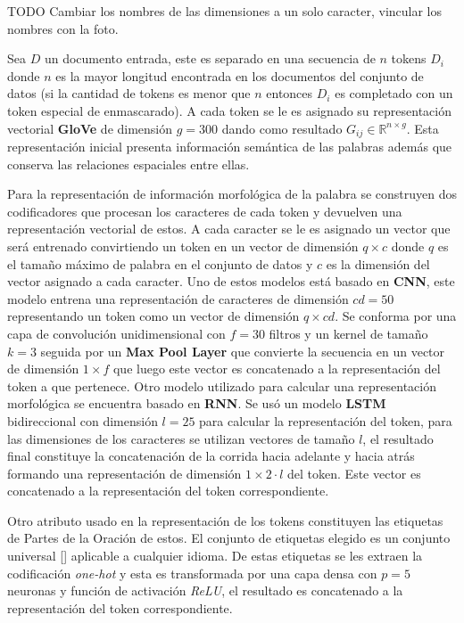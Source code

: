 TODO Cambiar los nombres de las dimensiones a un solo caracter, vincular los nombres con la foto.

Sea $D$ un documento entrada, este es separado en una secuencia de $n$ tokens $D_i$ donde $n$ es la mayor longitud encontrada
en los documentos del conjunto de datos (si la cantidad de tokens es menor que $n$ entonces $D_i$ es completado con un token especial de enmascarado). 
A cada token se le es asignado
su representación vectorial \textbf{GloVe} de dimensión $g=300$ dando como resultado $G_{ij} \in \mathbb{R}^{n \times g}$.
Esta representación inicial presenta información semántica de las palabras además que conserva las relaciones 
espaciales entre ellas. 

Para la representación de información morfológica de la palabra se construyen dos
codificadores que procesan los caracteres de cada token y devuelven una representación vectorial de estos.
A cada caracter se le es asignado un vector que será entrenado convirtiendo un token en un vector de dimensión
$q \times c$ donde $q$ es el tamaño máximo de palabra en el conjunto de datos y $c$ es la dimensión del vector
asignado a cada caracter.
Uno de estos modelos está basado en \textbf{CNN}, este modelo entrena una representación de caracteres de dimensión
$cd=50$ representando un token como un vector de dimensión $q \times cd$. Se conforma por una capa de convolución unidimensional
con $f=30$ filtros y un kernel de tamaño $k=3$ seguida por un \textbf{Max Pool Layer} que convierte la secuencia en un vector
de dimensión $1 \times f$ que luego este vector es concatenado a la representación del token a que pertenece.
Otro modelo utilizado para calcular una representación morfológica se encuentra basado en \textbf{RNN}. Se usó
un modelo \textbf{LSTM} bidireccional con dimensión $l=25$ para calcular la representación del token, para las dimensiones de los caracteres se
utilizan vectores de tamaño $l$, el resultado final constituye la concatenación de la corrida hacia adelante y
hacia atrás formando una representación de dimensión $1 \times 2 \cdot l$ del token. Este vector es concatenado a la representación
del token correspondiente.

Otro atributo usado en la representación de los tokens constituyen las etiquetas de Partes de la Oración de estos.
El conjunto de etiquetas elegido es un conjunto universal [\cite{petrov2011universal}] aplicable a cualquier idioma.
De estas etiquetas se les extraen la codificación \emph{one-hot} y esta es transformada por una capa densa con $p=5$ neuronas
y función de activación \emph{ReLU}, el resultado es concatenado a la representación del token correspondiente.

